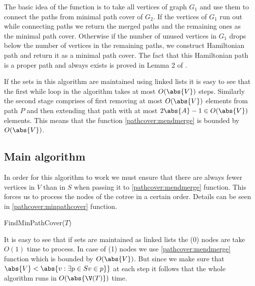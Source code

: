 The basic idea of the function is to take all vertices of graph $G_1$ and use them to connect the paths from minimal path cover of $G_2$. If the vertices of $G_1$ run out while connecting paths we return the merged paths and the remaining ones as the minimal path cover. Otherwise if the number of unused vertices in $G_1$ drops below the number of vertices in the remaining paths, we construct Hamiltonian path and return it as a minimal path cover. The fact that this Hamiltonian path is a proper path and always exists is proved in Lemma 2 of \cite{olariu}.

If the sets in this algorithm are maintained using linked lists it is easy to see that the first while loop in the algorithm takes at most $O(\abs{V})$ steps. Similarly the second stage comprises of first removing at most $O(\abs{V})$ elements from path $P$ and then extending that path with at most $2\abs{A} - 1 \in O(\abs{V})$ elements. This means that the function \ref{pathcover:mendmerge} is bounded by $O(\abs{V})$.

\subsection{Main algorithm}

In order for this algorithm to work we must ensure that there are always fewer vertices in $V$ than in $S$ when passing it to \ref{pathcover:mendmerge} function. This forces us to process the nodes of the cotree in a certain order. Details can be seen in \ref{pathcover:minpathcover} function.


\begin{function}
    \caption{FindMinPathCover($T$)}
    \label{pathcover:minpathcover}
    \DontPrintSemicolon

\end{function}

It is easy to see that if sets are maintained as linked lists the (0) nodes are take $O(1)$ time to process. In case of (1) nodes we use \ref{pathcover:mendmerge} function which is bounded by $O(\abs{V})$. But since we make sure that $\abs{V} < \abs{v : \exists{p \in S} v\in p\}}$ at each step it follows that the whole algorithm runs in $O(\abs{\V(T)})$ time.

